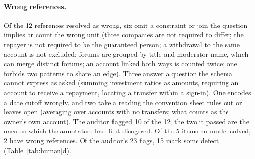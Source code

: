 \paragraph{Wrong references.} Of the 12 references resolved as wrong, six omit a constraint or join the question implies or count the wrong unit (three companies are not required to differ; the repayer is not required to be the guaranteed person; a withdrawal to the same account is not excluded; forums are grouped by title and moderator name, which can merge distinct forums; an account linked both ways is counted twice; one  forbids two patterns to share an edge). Three answer a question the schema cannot express as asked (summing investment ratios as amounts, requiring an account to receive a repayment, locating a transfer within a sign-in). One encodes a date cutoff wrongly, and two take a reading the convention sheet rules out or leaves open (averaging over accounts with no transfers; what counts as the owner's own account). The auditor flagged 10 of the 12; the two it passed are the ones on which the annotators had first disagreed. Of the 5 items no model solved, 2 have wrong references. Of the auditor's 23 flags, 15 mark some defect (Table~\ref{tab:human}d).


